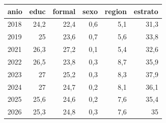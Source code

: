 \begin{tabular}{lrrrrr}
\toprule
anio & educ & formal & sexo & region & estrato \\
\midrule
2018 & 24,2 & 22,4 & 0,6 & 5,1 & 31,3 \\
2019 & 25 & 23,6 & 0,7 & 5,6 & 33,8 \\
2021 & 26,3 & 27,2 & 0,1 & 5,4 & 32,6 \\
2022 & 26,5 & 23,8 & 0,3 & 8,7 & 35,9 \\
2023 & 27 & 25,2 & 0,3 & 8,3 & 37,9 \\
2024 & 27 & 24,7 & 0,2 & 8,1 & 36,1 \\
2025 & 25,6 & 24,6 & 0,2 & 7,6 & 35,4 \\
2026 & 25,3 & 24,8 & 0,3 & 7,6 & 35 \\
\bottomrule
\end{tabular}
